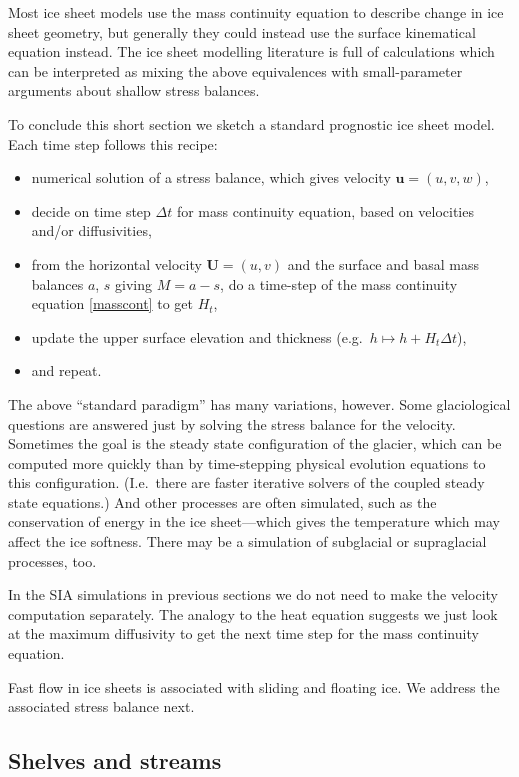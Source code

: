 \documentclass[titlepage,letterpaper,final,12pt]{scrartcl}
\begin{document}
Most ice sheet models use the mass continuity equation to describe change in ice sheet geometry, but generally they could instead use the surface kinematical equation instead.  The ice sheet modelling literature is full of calculations which can be interpreted as mixing the above equivalences with small-parameter arguments about shallow stress balances.

To conclude this short section we sketch a standard prognostic ice sheet model.  Each time step follows this recipe:
  \begin{itemize}
  \item numerical solution of a stress balance, which gives velocity $\mathbf{u}=(u,v,w)$,
  \item decide on time step $\Delta t$ for mass continuity equation, based on velocities and/or diffusivities,
  \item from the horizontal velocity $\mathbf{U}=(u,v)$ and the surface and basal mass balances $a$, $s$ giving $M=a-s$, do a time-step of the mass continuity equation \eqref{masscont} to get $H_t$,
  \item update the upper surface elevation and thickness (e.g.~$h \mapsto h + H_t \Delta t$),
  \item and repeat.
  \end{itemize}

The above ``standard paradigm'' has many variations, however.  Some glaciological questions are answered just by solving the stress balance for the velocity.  Sometimes the goal is the steady state configuration of the glacier, which can be computed more quickly than by time-stepping physical evolution equations to this configuration.  (I.e.~there are faster iterative solvers of the coupled steady state equations.)  And other processes are often simulated, such as the conservation of energy in the ice sheet---which gives the temperature which may affect the ice softness.  There may be a simulation of subglacial or supraglacial processes, too.

In the SIA simulations in previous sections we do not need to make the velocity computation separately.  The analogy to the heat equation suggests we just look at the maximum diffusivity to get the next time step for the mass continuity equation.

Fast flow in ice sheets is associated with sliding and floating ice.  We address the associated stress balance next.


\subsection{Shelves and streams} \label{sec:shelvesandstreams}
\end{document}
